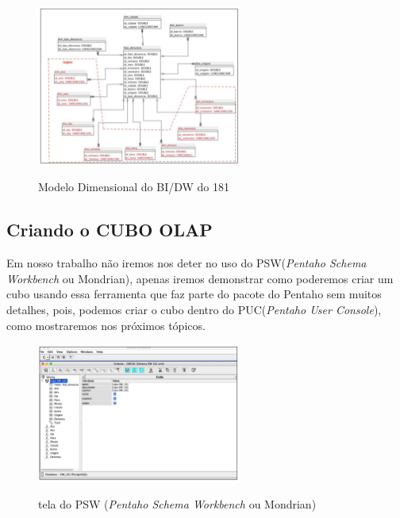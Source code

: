 \begin{figure}[H]
	\vspace*{0,2cm}
    \centering
    \caption{Modelo Dimensional do BI/DW do 181}
    \includegraphics[width=0.6\textwidth]{./04-figuras/figura-moddim}
    \label{fig:ilustfigmoddim}
\end{figure}
\vspace*{-0,9cm}
{\raggedright {}} 

\subsection{Criando o CUBO OLAP}

Em nosso trabalho n\~{a}o iremos nos deter no uso do 
PSW(\textit{Pentaho Schema Workbench} ou Mondrian), apenas iremos demonstrar como 
poderemos criar um cubo usando essa ferramenta que faz parte do pacote do
 Pentaho sem muitos detalhes, pois, podemos criar o cubo dentro do 
 PUC(\textit{Pentaho User Console}), como mostraremos nos pr\'oximos t\'opicos.

\begin{figure}[H]
	\vspace*{0,2cm}
    \centering
    \caption{tela do PSW (\textit{Pentaho Schema Workbench} ou Mondrian)}
    \includegraphics[width=0.6\textwidth]{./04-figuras/figura-pentaho-psw}
    \label{fig:ilustfigpentaho-psw}
\end{figure}
\vspace*{-0,9cm}
{\raggedright {}} \\

